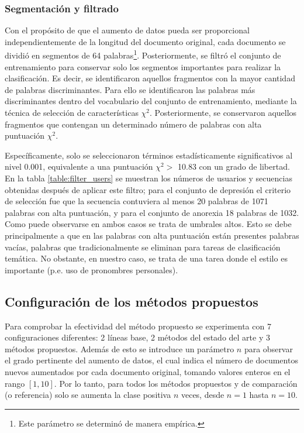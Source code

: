 \subsubsection{Segmentación y filtrado}
Con el propósito de que el aumento de datos pueda ser proporcional independientemente de la longitud del documento original, cada documento se dividió en segmentos de 64 palabras\footnote{Este parámetro se determinó de manera empírica.}. Posteriormente, se filtró el conjunto de entrenamiento para conservar solo los segmentos importantes para realizar la clasificación. Es decir, se identificaron aquellos fragmentos con la mayor cantidad de palabras discriminantes. Para ello se identificaron las  palabras más discriminantes dentro del vocabulario del conjunto de entrenamiento, mediante la técnica de selección de características $\chi^2$. Posteriormente, se conservaron aquellos fragmentos  que contengan un determinado número de palabras con alta puntuación $\chi^2$. 

Específicamente, solo se seleccionaron términos estadísticamente significativos al nivel 0.001, equivalente a una puntuación $\chi^2 > $ 10.83 con un grado de libertad. En la tabla \ref{table:filter_users} se muestran los números de usuarios y secuencias obtenidas después de aplicar este filtro; para el conjunto de depresión el criterio de selección fue que la secuencia contuviera al menos 20 palabras de 1071 palabras con alta puntuación, y para el conjunto de anorexia 18 palabras de 1032. Como puede observarse en ambos casos se trata de umbrales altos. Esto se debe principalmente a que en las palabras con alta puntuación están presentes palabras vacías, palabras que tradicionalmente se eliminan para tareas de clasificación temática. No obstante, en nuestro caso,  se trata de una tarea donde el estilo es importante (p.e. uso de pronombres personales).



\subsection{Configuración de los métodos propuestos}

Para comprobar la efectividad del método propuesto se experimenta con 7 configuraciones diferentes: 2 líneas base, 2 métodos del estado del arte y 3 métodos propuestos. Además de esto se introduce un parámetro $n$ para observar el grado pertinente del aumento de datos, el cual indica el número de documentos nuevos aumentados por cada documento original, tomando valores enteros en el rango $[1,10]$. Por lo tanto, para todos los métodos propuestos y de comparación (o referencia) solo se aumenta la clase positiva $n$ veces, desde $n=1$ hasta $n=10$.


